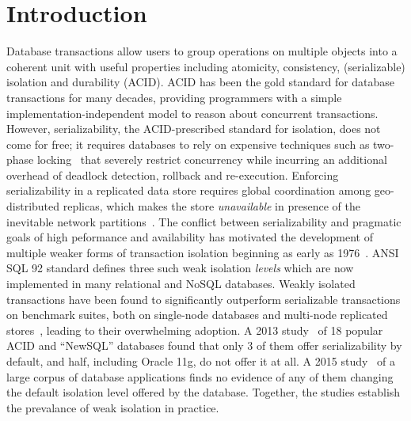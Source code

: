 \section{Introduction}

Database transactions allow users to group operations on multiple
objects into a coherent unit with useful properties including
atomicity, consistency, (serializable) isolation and durability
(ACID). ACID has been the gold standard for database transactions for
many decades, providing programmers with a simple
implementation-independent model to reason about concurrent
transactions. However, serializability, the ACID-prescribed standard for
isolation, does not come for free; it requires databases to rely on
expensive techniques such as two-phase locking~\cite{twopl,ullmanbook}
that severely restrict concurrency while incurring an additional
overhead of deadlock detection, rollback and re-execution. Enforcing
serializability in a replicated data store requires global
coordination among geo-distributed replicas, which makes the store
\emph{unavailable} in presence of the inevitable network
partitions~\cite{cap,sernotavlbl,bailishat,bernsigmod13}. The
conflict between serializability and pragmatic goals of high
peformance and availability has motivated the development of multiple
weaker forms of transaction isolation beginning as early as
1976~\cite{gray1976}. ANSI SQL 92 standard defines three such weak
isolation \emph{levels} which are now implemented in
many relational and NoSQL databases. Weakly isolated transactions have
been found to significantly outperform serializable transactions on
benchmark suites, both on single-node databases and multi-node
replicated stores~\cite{dbtuningbook,bailishat,bailisvldb}, leading to
their overwhelming adoption. A 2013 study~\cite{bailishotos} of 18
popular ACID and ``NewSQL'' databases found that only 3 of them offer
serializability by default, and half, including Oracle 11g, do not
offer it at all.  A 2015 study~\cite{bailisferal} of a large corpus of
database applications finds no evidence of any of them changing the
default isolation level offered by the database. Together, the studies
establish the prevalance of weak isolation in practice.

